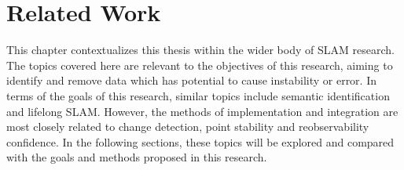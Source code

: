 \section{Related Work}
\label{sec:related_work}

This chapter contextualizes this thesis within the wider body of SLAM research. The topics covered here are relevant to the objectives of this research, aiming to identify and remove data which has potential to cause instability or error.
In terms of the goals of this research, similar topics include semantic identification and lifelong SLAM. However, the methods of implementation and integration are most closely related to change detection, point stability and reobservability confidence. In the following sections, these topics will be explored and compared with the goals and methods proposed in this research.

% 